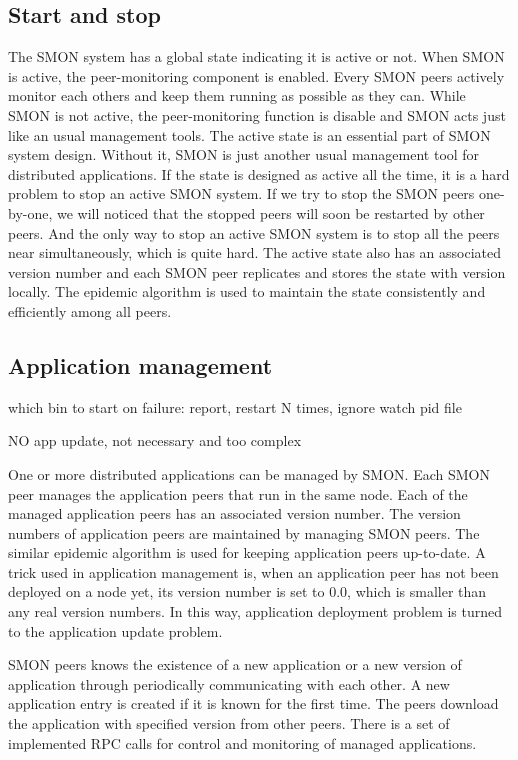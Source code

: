 \subsection{Start and stop}

The SMON system has a global state indicating it is active
or not. When SMON is active, the peer-monitoring component
is enabled. Every SMON peers actively monitor each others
and keep them running as possible as they can. While SMON is
not active, the peer-monitoring function is disable and SMON
acts just like an usual management tools. The active state
is an essential part of SMON system design. Without it, SMON
is just another usual management tool for distributed
applications. If the state is designed as active all the
time, it is a hard problem to stop an active SMON system. If
we try to stop the SMON peers one-by-one, we will noticed
that the stopped peers will soon be restarted by other
peers. And the only way to stop an active SMON system is to
stop all the peers near simultaneously, which is quite hard.
The active state also has an associated version number and
each SMON peer replicates and stores the state with version
locally.  The epidemic algorithm is used to maintain the
state consistently and efficiently among all peers.

\subsection{Application management}

which bin to start
on failure: report, restart N times, ignore
watch pid file

NO app update, not necessary and too complex

One or more distributed applications can be managed by SMON. Each
SMON peer manages the application peers that run in the same
node. Each of the managed application peers has an associated
version number.  The version numbers of application peers are
maintained by managing SMON peers. The similar epidemic algorithm
is used for keeping application peers up-to-date. A trick used
in application management is, when an application peer has not
been deployed on a node yet, its version number is set to 0.0,
which is smaller than any real version numbers. In this way,
application deployment problem is turned to the application
update problem.

SMON peers knows the existence of a new application or a new
version of application through periodically communicating with each
other. A new application entry is created if it is known for the
first time.  The peers download the application with specified
version from other peers. There is a set of implemented RPC
calls for control and monitoring of managed applications.


